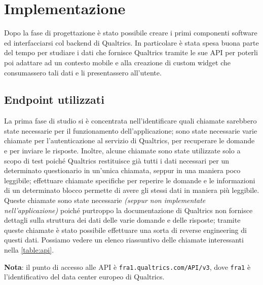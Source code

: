 \chapter{Implementazione}
Dopo la fase di progettazione è stato possibile creare i primi componenti software ed interfacciarsi col backend di Qualtrics. In particolare è stata spesa buona parte del tempo per studiare i dati che fornisce Qualtrics tramite le sue API per poterli poi adattare ad un contesto mobile e alla creazione di custom widget che consumassero tali dati e li presentassero all'utente.

\section{Endpoint utilizzati}
La prima fase di studio si è concentrata nell'identificare quali chiamate sarebbero state necessarie per il funzionamento dell'applicazione; sono state necessarie varie chiamate per l'autenticazione al servizio di Qualtrics, per recuperare le domande e per inviare le risposte. Inoltre, alcune chiamate sono state utilizzate solo a scopo di test poiché Qualtrics restituisce già tutti i dati necessari per un determinato questionario in un'unica chiamata, seppur in una maniera poco leggibile; effettuare chiamate specifiche per reperire le domande e le informazioni di un determinato blocco permette di avere gli stessi dati in maniera più leggibile. Queste chiamate sono state necessarie \textit{(seppur non implementate nell'applicazione)} poiché purtroppo la documentazione di Qualtrics non fornisce dettagli sulla struttura dei dati delle varie domande e delle risposte; tramite queste chiamate è stato possibile effettuare una sorta di reverse engineering di questi dati.
Possiamo vedere un elenco riassuntivo delle chiamate interessanti nella \autoref{table:api}.



\textbf{Nota}: il punto di accesso alle API è \texttt{fra1.qualtrics.com/API/v3}, dove \texttt{fra1} è l'identificativo del data center europeo di Qualtrics.

\newpage

